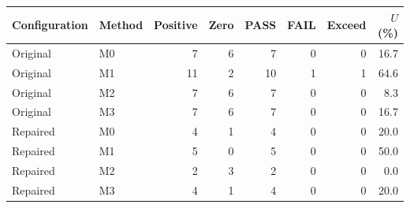 \begin{tabular}{llrrrrrr}
\toprule
Configuration & Method & Positive & Zero & PASS & FAIL & Exceed & $U$ (\%) \\
\midrule
Original & M0 & 7 & 6 & 7 & 0 & 0 & 16.7 \\
Original & M1 & 11 & 2 & 10 & 1 & 1 & 64.6 \\
Original & M2 & 7 & 6 & 7 & 0 & 0 & 8.3 \\
Original & M3 & 7 & 6 & 7 & 0 & 0 & 16.7 \\
Repaired & M0 & 4 & 1 & 4 & 0 & 0 & 20.0 \\
Repaired & M1 & 5 & 0 & 5 & 0 & 0 & 50.0 \\
Repaired & M2 & 2 & 3 & 2 & 0 & 0 & 0.0 \\
Repaired & M3 & 4 & 1 & 4 & 0 & 0 & 20.0 \\
\bottomrule
\end{tabular}
